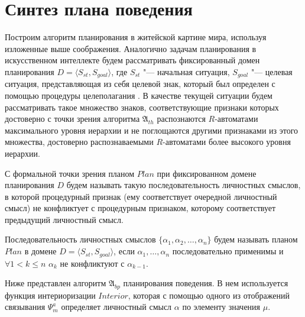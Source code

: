 \documentclass[a4paper, 12pt]{article}
\newcommand{\stretchsize}{2}
\renewcommand{\baselinestretch}{\stretchsize}
\numberwithin{equation}{section}
\begin{document}
	\section{Синтез плана поведения} \label{sect:plan}
	Построим алгоритм планирования в житейской картине мира, используя изложенные выше соображения. Аналогично задачам планирования в искусственном интеллекте \cite{Fikes1971} будем рассматривать фиксированный домен планирования $D=\langle S_{st},S_{goal} \rangle$, где $S_{st}$ "--- начальная ситуация, $S_{goal}$ "--- целевая ситуация, представляющая из себя целевой знак, который был определен с помощью процедуры целеполагания \cite{PanovA2014a}. В качестве текущей ситуации будем рассматривать такое множество знаков, соответствующие признаки которых достоверно с точки зрения алгоритма $\mathfrak A_{th}$ распознаются $R$-автоматами максимального уровня иерархии и не поглощаются другими признаками из этого множества, достоверно распознаваемыми $R$-автоматами более высокого уровня иерархии.
	
	С формальной точки зрения планом $Plan$ при фиксированном домене планирования $D$ будем называть такую последовательность личностных смыслов, в которой процедурный признак (ему соответствует очередной личностный смысл) не конфликтует с процедурным признаком, которому соответствует предыдущий личностный смысл.
	
		Последовательность личностных смыслов $\{\alpha_1,\alpha_2,\dots,\alpha_n\}$ будем называть планом $Plan$ в домене $D=\langle S_{st},S_{goal} \rangle$, если $\alpha_1,\dots,\alpha_n$ последовательно применимы и $\forall 1<k\leqslant n$ $\alpha_k$ не конфликтуют с $\alpha_{k-1}$.

	Ниже представлен алгоритм $\mathfrak A_{bp}$ планирования поведения. В нем используется функция интериоризации $Interior$, которая с помощью одного из отображений связывания $\Psi_m^a$ \cite{PanovA2014a} определяет личностный смысл $\alpha$ по элементу значения $\mu$.
	
	\renewcommand{\baselinestretch}{1}
	\begin{algorithm}[H]
		\begin{algorithmic}[1]
			
		\end{algorithmic}
	\end{algorithm}
	\renewcommand{\baselinestretch}{\stretchsize}
		
\end{document}

